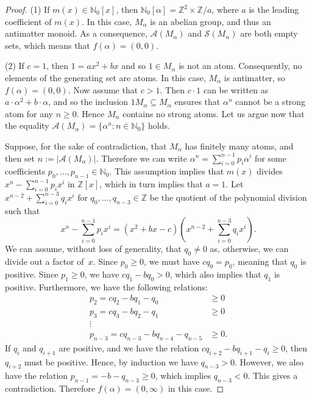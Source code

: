 \documentclass[11pt]{amsart}
\theoremstyle{definition}
\theoremstyle{remark}
\numberwithin{equation}{section}
\newcommand{\nn}{\mathbb{N}}
\newcommand{\zz}{\mathbb{Z}}
\begin{document}
\begin{proof}
	(1)  If $m(x) \in \nn_0[x]$, then $\nn_0[\alpha] = \zz^2 \times \zz/a$,
    where $a$ is the leading coefficient of $m(x)$.
    In this case, $M_\alpha$ is an abelian group, and thus an antimatter monoid. As a consequence, $\mathcal{A}(M_\alpha)$ and $\mathcal{S}(M_\alpha)$ are both empty sets, which means that $f(\alpha) = (0,0)$.
	\smallskip
	
    (2) If $c=1$, then $1=ax^2+bx$ and so $1\in M_\alpha$ is not an atom. Consequently, no elements of the generating set are atoms. In this case, $M_\alpha$ is antimatter, so $f(\alpha) = (0,0)$. Now assume that $c>1$. Then $c\cdot 1$ can be written as $a\cdot \alpha^2+b\cdot \alpha$, and so the inclusion $1 M_\alpha \subseteq M_\alpha$ ensures that $\alpha^n$ cannot be a strong atom for any $n \ge 0$. Hence $M_\alpha$ contains no strong atoms. Let us argue now that the equality $\mathcal{A}(M_\alpha) = \{\alpha^n : n \in \nn_0 \}$ holds. 

    Suppose, for the sake of contradiction, that $M_\alpha$ has finitely many atoms, and then set $n := |\mathcal{A}(M_\alpha)|$. Therefore we can write $\alpha^n = \sum_{i=0}^{n-1}p_i\alpha^i$ for some coefficients $p_0, \dots, p_{n-1} \in\mathbb{N}_0$. This assumption implies that $m(x)$ divides $x^n-\sum_{i=0}^{n-1}p_ix^i$ in $\zz[x]$, which in turn implies that $a=1$. Let $x^{n-2}+\sum_{i=0}^{n-3} q_ix^i$ for $q_0, \dots, q_{n-3}\in\mathbb{Z}$ be the quotient of the polynomial division such that
    \[
        x^n-\sum_{i=0}^{n-1}p_ix^i = (x^2+bx-c)\left(x^{n-2}+\sum_{i=0}^{n-3}q_ix^i\right).
    \]
    We can assume, without loss of generality, that $q_0 \neq 0$ as, otherwise, we can divide out a factor of~$x$. Since $p_0\geq 0$, we must have $cq_0=p_0$, meaning that $q_0$ is positive. Since $p_1\geq 0$, we have $cq_1-bq_0>0$, which also implies that $q_1$ is positive. Furthermore, we have the following relations: 
    \begin{align*}
       p_2 = cq_2-bq_1-q_0&\geq 0 \\
       p_3 = cq_3-bq_2-q_1&\geq 0 \\ 
       \vdots\\
       p_{n-3} = cq_{n-3}-bq_{n-4}-q_{n-5}&\geq 0.
    \end{align*}
    If $q_i$ and $q_{i+1}$ are positive, and we have the relation $cq_{i+2}-bq_{i+1}-q_i\geq 0$, then $q_{i+2}$ must be positive. Hence, by induction we have $q_{n-3}>0$. However, we also have the relation $p_{n-1}=-b-q_{n-3}\geq 0$, which implies $q_{n-3}<0$. This gives a contradiction. Therefore $f(\alpha) = (0,\infty)$ in this case.
    \smallskip
    

\end{proof}
\end{document}
